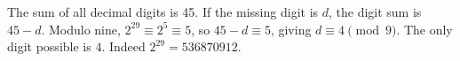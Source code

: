 The sum of all decimal digits is 45. If the missing digit is $d$, the digit sum is $45-d$. Modulo nine, $2^{29}\equiv2^5\equiv5$, so $45-d\equiv5$, giving $d\equiv4\pmod9$. The only digit possible is $\boxed4$. Indeed $2^{29}=536870912$.
